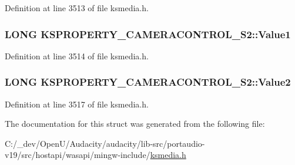 Definition at line 3513 of file ksmedia.\+h.

\subsubsection[{\texorpdfstring{Value1}{Value1}}]{\setlength{\rightskip}{0pt plus 5cm}L\+O\+NG K\+S\+P\+R\+O\+P\+E\+R\+T\+Y\+\_\+\+C\+A\+M\+E\+R\+A\+C\+O\+N\+T\+R\+O\+L\+\_\+\+S2\+::\+Value1}\hypertarget{struct_k_s_p_r_o_p_e_r_t_y___c_a_m_e_r_a_c_o_n_t_r_o_l___s2_a821cd27217194fe95194150913f2a472}{}\label{struct_k_s_p_r_o_p_e_r_t_y___c_a_m_e_r_a_c_o_n_t_r_o_l___s2_a821cd27217194fe95194150913f2a472}


Definition at line 3514 of file ksmedia.\+h.

\subsubsection[{\texorpdfstring{Value2}{Value2}}]{\setlength{\rightskip}{0pt plus 5cm}L\+O\+NG K\+S\+P\+R\+O\+P\+E\+R\+T\+Y\+\_\+\+C\+A\+M\+E\+R\+A\+C\+O\+N\+T\+R\+O\+L\+\_\+\+S2\+::\+Value2}\hypertarget{struct_k_s_p_r_o_p_e_r_t_y___c_a_m_e_r_a_c_o_n_t_r_o_l___s2_a659743c8a0979d68f3cec32ff5213eed}{}\label{struct_k_s_p_r_o_p_e_r_t_y___c_a_m_e_r_a_c_o_n_t_r_o_l___s2_a659743c8a0979d68f3cec32ff5213eed}


Definition at line 3517 of file ksmedia.\+h.



The documentation for this struct was generated from the following file\+:\begin{DoxyCompactItemize}
\item 
C\+:/\+\_\+dev/\+Open\+U/\+Audacity/audacity/lib-\/src/portaudio-\/v19/src/hostapi/wasapi/mingw-\/include/\hyperlink{ksmedia_8h}{ksmedia.\+h}\end{DoxyCompactItemize}
